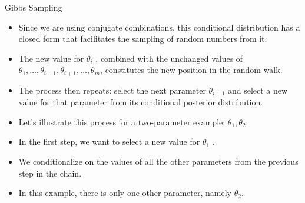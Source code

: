 \documentclass[handout]{beamer}
\begin{document}
\begin{frame}{Gibbs Sampling}
\scriptsize{

\begin{itemize}

\item Since we are using conjugate combinations, this conditional distribution has a closed form that facilitates the sampling of random numbers from it.

\item The new value for $\theta_i$ , combined with the unchanged values of $\theta_1,\dots, \theta_{i-1}, \theta_{i+1}, \dots,\theta_m$, constitutes the new position in the random walk.

\item The process then repeats: select the next parameter $\theta_{i+1}$ and select a new value for that parameter from its conditional posterior distribution.

\item Let's illustrate this process for a two-parameter example: $\theta_1,\theta_2$.

\item In the first step, we want to select a new value for $\theta_1$ . 

\item We conditionalize on the values of all the other
parameters from the previous step in the chain. 

\item In this example, there is only one other parameter, namely $\theta_2$.


\end{itemize}


} 
\end{frame}
\end{document}
